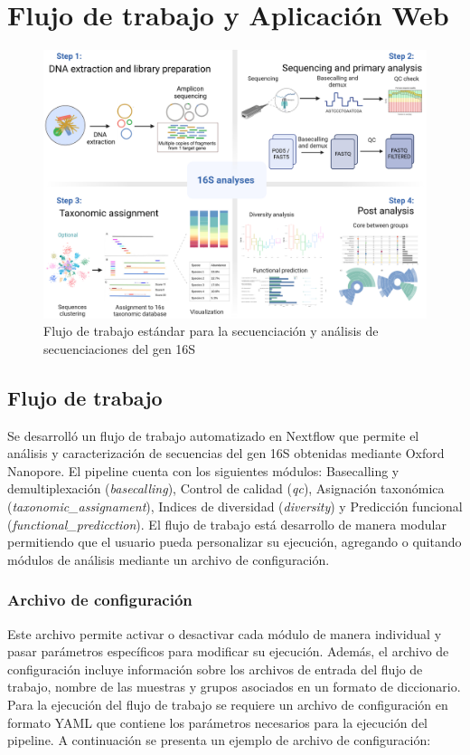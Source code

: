 \chapter{Flujo de trabajo y Aplicación Web}

\begin{figure}[H]
    \centering
    \includegraphics[width=1\linewidth]{images/16s_workflow_schema.jpeg}
    \caption{Flujo de trabajo estándar para la secuenciación y análisis de secuenciaciones del gen 16S}
    \label{fig:16S_workflow}
\end{figure}
\section{Flujo de trabajo}
Se desarrolló un flujo de trabajo automatizado en Nextflow que permite el análisis y caracterización de secuencias del gen 16S obtenidas mediante Oxford Nanopore. 
El pipeline cuenta con los siguientes módulos: Basecalling y demultiplexación (\textit{basecalling}), Control de calidad (\textit{qc}), Asignación taxonómica (\textit{taxonomic\_assignament}), Indices de diversidad (\textit{diversity}) y Predicción funcional (\textit{functional\_predicction}).
El flujo de trabajo está desarrollo de manera modular permitiendo que el usuario pueda personalizar su ejecución, agregando o quitando módulos de análisis mediante un archivo de configuración. 

\subsection{Archivo de configuración}
Este archivo permite activar o desactivar cada módulo de manera individual y pasar parámetros específicos para modificar su ejecución. 
Además, el archivo de configuración incluye información sobre los archivos de entrada del flujo de trabajo, nombre de las muestras y grupos asociados en un formato de diccionario.
Para la ejecución del flujo de trabajo se requiere un archivo de configuración en formato YAML que contiene los parámetros necesarios para la ejecución del pipeline. 
A continuación se presenta un ejemplo de archivo de configuración:



